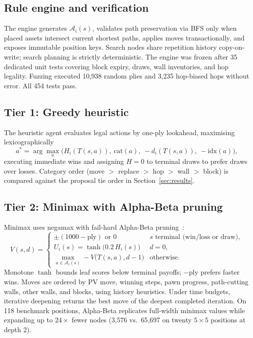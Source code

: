 \documentclass[10pt]{article}
\begin{document}
\subsection{Rule engine and verification}
The engine generates $\mathcal{A}_i(s)$, validates path preservation via BFS only when placed assets intersect current shortest paths, applies moves transactionally, and exposes immutable position keys. Search nodes share repetition history copy-on-write; search planning is strictly deterministic. The engine was frozen after 35 dedicated unit tests covering block expiry, draws, wall inventories, and hop legality. Fuzzing executed 10{,}938 random plies and 3{,}235 hop-biased hops without error. All 454 tests pass.

\subsection{Tier 1: Greedy heuristic}
The heuristic agent evaluates legal actions by one-ply lookahead, maximising lexicographically
\begin{equation}
a^*=\arg\max_a \big(H_i(T(s,a)),\ \mathrm{cat}(a),\ -d_i(T(s,a)),\ -\mathrm{idx}(a)\big),
\end{equation}
executing immediate wins and assigning $H=0$ to terminal draws to prefer draws over losses. Category order (move $>$ replace $>$ hop $>$ wall $>$ block) is compared against the proposal tie order in Section~\ref{sec:results}.

\subsection{Tier 2: Minimax with Alpha-Beta pruning}
Minimax uses negamax with fail-hard Alpha-Beta pruning~\cite{knuth1975}:
\begin{equation}
V(s,d)=\begin{cases}\pm(1000-\text{ply}) \text{ or } 0 & s \text{ terminal (win/loss or draw)},\\ U_i(s)=\tanh\!\big(0.2\,H_i(s)\big) & d=0,\\ \max_{a\in\mathcal{A}_i(s)} -V\big(T(s,a),d-1\big) & \text{otherwise.}\end{cases}
\end{equation}
Monotone $\tanh$ bounds leaf scores below terminal payoffs; $-\text{ply}$ prefers faster wins. Moves are ordered by PV move, winning steps, pawn progress, path-cutting walls, other walls, and blocks, using history heuristics. Under time budgets, iterative deepening returns the best move of the deepest completed iteration. On 118 benchmark positions, Alpha-Beta replicates full-width minimax values while expanding up to $24\times$ fewer nodes (3{,}576 vs.\ 65{,}697 on twenty $5\times5$ positions at depth 2).
\end{document}

